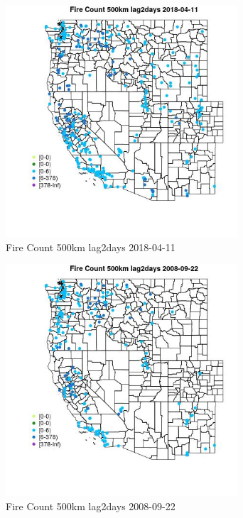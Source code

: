 \begin{figure} 
\centering  
\includegraphics[width=0.77\textwidth]{Code_Outputs/Report_ML_input_PM25_Step4_part_e_de_duplicated_aves_compiled_2019-05-18wNAs_MapObsFire_Count_500km_lag2days2018-04-11.jpg} 
\caption{\label{fig:Report_ML_input_PM25_Step4_part_e_de_duplicated_aves_compiled_2019-05-18wNAsMapObsFire_Count_500km_lag2days2018-04-11}Fire Count 500km lag2days 2018-04-11} 
\end{figure} 
 

\begin{figure} 
\centering  
\includegraphics[width=0.77\textwidth]{Code_Outputs/Report_ML_input_PM25_Step4_part_e_de_duplicated_aves_compiled_2019-05-18wNAs_MapObsFire_Count_500km_lag2days2008-09-22.jpg} 
\caption{\label{fig:Report_ML_input_PM25_Step4_part_e_de_duplicated_aves_compiled_2019-05-18wNAsMapObsFire_Count_500km_lag2days2008-09-22}Fire Count 500km lag2days 2008-09-22} 
\end{figure} 
 

